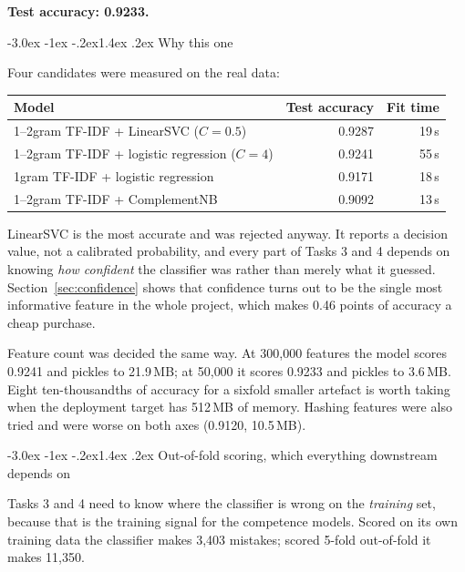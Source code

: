 \documentclass[11pt,a4paper]{article}
\makeatletter
\renewcommand\subsection{\@startsection{subsection}{2}{\z@}%
  {-3.0ex \@plus -1ex \@minus -.2ex}{1.4ex \@plus .2ex}%
  {\normalfont\large\sffamily\bfseries\color{accent}}}
\makeatother
\begin{document}
\textbf{Test accuracy: 0.9233.}

\subsection{Why this one}

Four candidates were measured on the real data:

\begin{center}
\small
\begin{tabular}{@{}lrr@{}}
\toprule
\textbf{Model} & \textbf{Test accuracy} & \textbf{Fit time} \\
\midrule
1--2gram TF-IDF + LinearSVC ($C = 0.5$)        & 0.9287 & 19\,s \\
1--2gram TF-IDF + logistic regression ($C = 4$) & 0.9241 & 55\,s \\
1gram TF-IDF + logistic regression              & 0.9171 & 18\,s \\
1--2gram TF-IDF + ComplementNB                  & 0.9092 & 13\,s \\
\bottomrule
\end{tabular}
\end{center}

LinearSVC is the most accurate and was rejected anyway. It reports a decision
value, not a calibrated probability, and every part of Tasks 3 and 4 depends on
knowing \emph{how confident} the classifier was rather than merely what it
guessed. Section~\ref{sec:confidence} shows that confidence turns out to be the
single most informative feature in the whole project, which makes 0.46 points of
accuracy a cheap purchase.

Feature count was decided the same way. At 300{,}000 features the model scores
0.9241 and pickles to 21.9\,MB; at 50{,}000 it scores 0.9233 and pickles to
3.6\,MB. Eight ten-thousandths of accuracy for a sixfold smaller artefact is
worth taking when the deployment target has 512\,MB of memory. Hashing features
were also tried and were worse on both axes (0.9120, 10.5\,MB).

\subsection{Out-of-fold scoring, which everything downstream depends on}

Tasks 3 and 4 need to know where the classifier is wrong on the \emph{training}
set, because that is the training signal for the competence models. Scored on its
own training data the classifier makes 3{,}403 mistakes; scored 5-fold
out-of-fold it makes 11{,}350.
\end{document}
